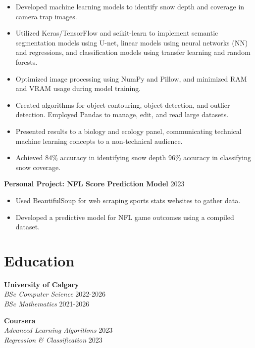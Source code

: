 \documentclass[a4paper,11pt]{article}
\begin{document}
\begin{itemize}[leftmargin=0.5cm]
    \item Developed machine learning models to identify snow depth and coverage in camera trap images.
    \item Utilized Keras/TensorFlow and scikit-learn to implement semantic segmentation models using U-net, linear models using neural networks (NN) and regressions, and classification models using transfer learning and random forests.
    \item Optimized image processing using NumPy and Pillow, and minimized RAM and VRAM usage during model training.
    \item Created algorithms for object contouring, object detection, and outlier detection. Employed Pandas to manage, edit, and read large datasets.
    \item Presented results to a biology and ecology panel, communicating technical machine learning concepts to a non-technical audience.
    \item Achieved 84\% accuracy in identifying snow depth 96\% accuracy in classifying snow coverage.
\end{itemize}

\vspace{0.5cm}

\textbf{Personal Project: NFL Score Prediction Model} \hfill 2023
\begin{itemize}[leftmargin=0.5cm]
    \item Used BeautifulSoup for web scraping sports stats websites to gather data.
    \item Developed a predictive model for NFL game outcomes using a compiled dataset.
\end{itemize}

\vspace{0.2cm}

\section*{Education}

\noindent
\begin{minipage}[t]{0.45\textwidth} %
    \textbf{University of Calgary} \\
    \textit{BSc Computer Science} \hfill 2022-2026 \\
    \textit{BSc Mathematics} \hfill 2021-2026
\end{minipage}
\hfill %
\begin{minipage}[t]{0.45\textwidth} %
    \textbf{Coursera} \\
    \textit{Advanced Learning Algorithms} \hfill 2023 \\
    \textit{Regression \& Classification} \hfill 2023
\end{minipage}
\end{document}

